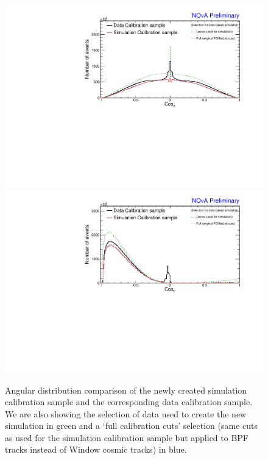 \begin{figure}[!ht]
\includegraphics[width=\textwidth]{Plots/TBCalibration/DBSim_DataMCComparison_CosX.pdf}
\includegraphics[width=\textwidth]{Plots/TBCalibration/DBSim_DataMCComparison_CosY.pdf}
\caption[Data-Simulation comparison of angular distributions]{Angular distribution comparison of the newly created simulation calibration sample and the corresponding data calibration sample. We are also showing the selection of data used to create the new simulation in green and a `full calibration cuts' selection (same cuts as used for the simulation calibration sample but applied to \acrshort{BPF} tracks instead of Window cosmic tracks) in blue.}
\label{fig:DataBasedSimDataMCComparison_cosXcosY}
\end{figure}

